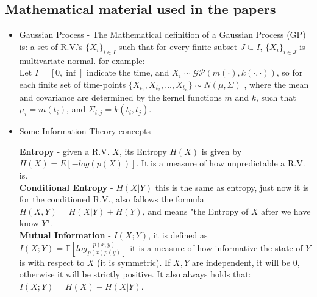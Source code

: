 \documentclass{article}
\begin{document}
	\subsection{Mathematical material used in the papers}
	\begin{itemize}
		\item Gaussian Process - The Mathematical definition of a Gaussian Process (GP) is:
		 a set of R.V.'s $\{X_i\}_{i \in I}$ such that for every finite subset $J \subseteq I$, $\{X_i\}_{i \in J}$ is multivariate normal. for example: \\
		 Let $I=[0,\inf]$ indicate the time, and ${X_i} \sim \mathcal{GP}(m(\cdot), k(\cdot,\cdot))$, so for each finite set of time-points
		 $\{X_{t_1},X_{t_2},...,X_{t_n}\} \sim N(\mu,\Sigma)$ , where the mean and covariance are determined by the kernel functions 
		 $m$ and $k$, such that $\mu_i = m(t_i)$, and $\Sigma_{i,j} = k(t_i, t_j)$. 
		\item Some Information Theory concepts - 
		
		\textbf{Entropy} - given a R.V. $X$, its Entropy $H(X)$ is given by $H(X)=E[-log(p(X))]$. It is a measure of how unpredictable a R.V. is. \\ 
		
		\textbf{Conditional Entropy} - $H(X|Y)$  this is the same as entropy, just now it is for the conditioned R.V., also fallows the formula $H(X,Y)=H(X|Y) + H(Y)$, and means "the Entropy of $X$ after we have know $Y$".\\
		  
		\textbf{Mutual Information} - $I(X;Y)$, it is defined as $I(X;Y)=\mathbb{E}\left[log\frac{p(x,y)}{p(x)p(y)}\right]$ it is  a measure of how informative the state of $Y$ is with respect to $X$ (it is symmetric). If $X,Y$ are independent, it will be 0, otherwise it will be strictly positive.
		It also always holds that: $I(X;Y)=H(X)-H(X|Y)$. 
			
	\end{itemize}
	
\end{document}
